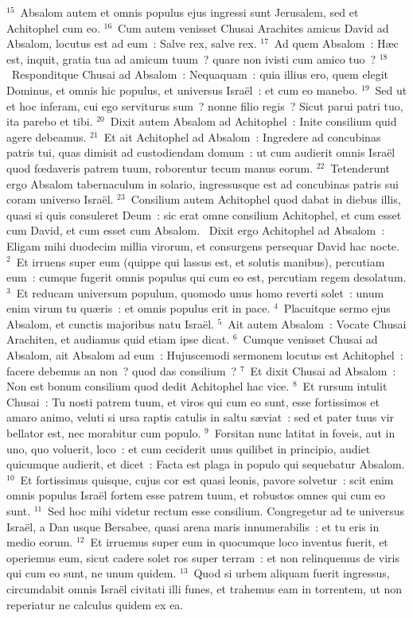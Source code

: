 ${}^{15}$~Absalom autem et omnis populus ejus ingressi sunt Jerusalem, sed et Achitophel cum eo.
${}^{16}$~Cum autem venisset Chusai Arachites amicus David ad Absalom, locutus est ad eum~: Salve rex, salve rex.
${}^{17}$~Ad quem Absalom~: H\ae c est, inquit, gratia tua ad amicum tuum~? quare non ivisti cum amico tuo~?
${}^{18}$~Responditque Chusai ad Absalom~: Nequaquam~: quia illius ero, quem elegit Dominus, et omnis hic populus, et universus Isra\"el~: et cum eo manebo.
${}^{19}$~Sed ut et hoc inferam, cui ego serviturus sum~? nonne filio regis~? Sicut parui patri tuo, ita parebo et tibi.
${}^{20}$~Dixit autem Absalom ad Achitophel~: Inite consilium quid agere debeamus.
${}^{21}$~Et ait Achitophel ad Absalom~: Ingredere ad concubinas patris tui, quas dimisit ad custodiendam domum~: ut cum audierit omnis Isra\"el quod fœdaveris patrem tuum, roborentur tecum manus eorum.
${}^{22}$~Tetenderunt ergo Absalom tabernaculum in solario, ingressusque est ad concubinas patris sui coram universo Isra\"el.
${}^{23}$~Consilium autem Achitophel quod dabat in diebus illis, quasi si quis consuleret Deum~: sic erat omne consilium Achitophel, et cum esset cum David, et cum esset cum Absalom.
~Dixit ergo Achitophel ad Absalom~: Eligam mihi duodecim millia virorum, et consurgens persequar David hac nocte.
${}^{2}$~Et irruens super eum (quippe qui lassus est, et solutis manibus), percutiam eum~: cumque fugerit omnis populus qui cum eo est, percutiam regem desolatum.
${}^{3}$~Et reducam universum populum, quomodo unus homo reverti solet~: unum enim virum tu qu\ae ris~: et omnis populus erit in pace.
${}^{4}$~Placuitque sermo ejus Absalom, et cunctis majoribus natu Isra\"el.
${}^{5}$~Ait autem Absalom~: Vocate Chusai Arachiten, et audiamus quid etiam ipse dicat.
${}^{6}$~Cumque venisset Chusai ad Absalom, ait Absalom ad eum~: Hujuscemodi sermonem locutus est Achitophel~: facere debemus an non~? quod das consilium~?
${}^{7}$~Et dixit Chusai ad Absalom~: Non est bonum consilium quod dedit Achitophel hac vice.
${}^{8}$~Et rursum intulit Chusai~: Tu nosti patrem tuum, et viros qui cum eo sunt, esse fortissimos et amaro animo, veluti si ursa raptis catulis in saltu s\ae viat~: sed et pater tuus vir bellator est, nec morabitur cum populo.
${}^{9}$~Forsitan nunc latitat in foveis, aut in uno, quo voluerit, loco~: et cum ceciderit unus quilibet in principio, audiet quicumque audierit, et dicet~: Facta est plaga in populo qui sequebatur Absalom.
${}^{10}$~Et fortissimus quisque, cujus cor est quasi leonis, pavore solvetur~: scit enim omnis populus Isra\"el fortem esse patrem tuum, et robustos omnes qui cum eo sunt.
${}^{11}$~Sed hoc mihi videtur rectum esse consilium. Congregetur ad te universus Isra\"el, a Dan usque Bersabee, quasi arena maris innumerabilis~: et tu eris in medio eorum.
${}^{12}$~Et irruemus super eum in quocumque loco inventus fuerit, et operiemus eum, sicut cadere solet ros super terram~: et non relinquemus de viris qui cum eo sunt, ne unum quidem.
${}^{13}$~Quod si urbem aliquam fuerit ingressus, circumdabit omnis Isra\"el civitati illi funes, et trahemus eam in torrentem, ut non reperiatur ne calculus quidem ex ea.


